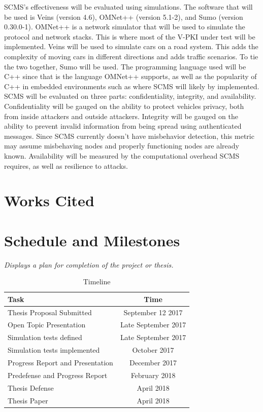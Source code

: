 \documentclass {article}
\newcommand{\sechint}[1]{\small{\emph{#1}} \bigskip}
\begin{document}
SCMS's effectiveness will be evaluated using simulations. The software that will be used is Veins (version 4.6), OMNet++ (version 5.1-2), and Sumo (version 0.30.0-1). OMNet++ is a network simulator that will be used to simulate the protocol and network stacks. This is where most of the V-PKI under test will be implemented. Veins will be used to simulate cars on a road system. This adds the complexity of moving cars in different directions and adds traffic scenarios. To tie the two together, Sumo will be used.
The programming language used will be C++ since that is the language OMNet++ supports, as well as the popularity of C++ in embedded environments such as where SCMS will likely by implemented. SCMS will be evaluated on three parts: confidentiality, integrity, and availability. Confidentiality will be gauged on the ability to protect vehicles privacy, both from inside attackers and outside attackers. Integrity will be gauged on the ability to prevent invalid information from being spread using authenticated messages. Since SCMS currently doesn't have misbehavior detection, this metric may assume misbehaving nodes and properly functioning nodes are already known. Availability will be measured by the computational overhead SCMS requires, as well as resilience to attacks.

\pagebreak
\section{Works Cited}
\printbibliography[title={\ }]

\pagebreak
\section{Schedule and Milestones}{\sechint{Displays a plan for completion of the project or thesis.}}

\begin{table}[!ht]
	\centering
	\begin{tabular}{l|c}
		Task & Time \\ \hline \hline
		Thesis Proposal Submitted & September 12 2017 \\ \hline
		Open Topic Presentation & Late September 2017 \\ \hline
		Simulation tests defined & Late September 2017 \\ \hline
		Simulation tests implemented & October 2017 \\ \hline
		Progress Report and Presentation & December 2017 \\ \hline
		Predefense and Progress Report & February 2018 \\ \hline
		Thesis Defense & April 2018 \\ \hline
		Thesis Paper & April 2018 \\ \hline
	\end{tabular}
	\caption{Timeline}
\end{table}
\end{document}
